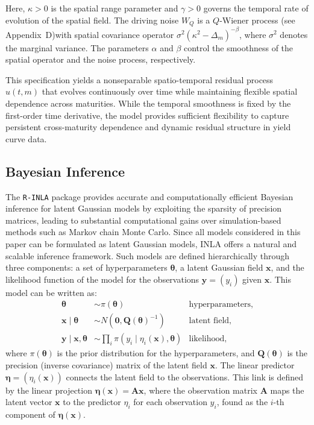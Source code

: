 \documentclass[
  12pt]{article}
\begin{document}
Here, $\kappa > 0$ is the spatial range parameter and $\gamma > 0$ governs the temporal rate of evolution of the spatial field. The driving noise $W_Q$ is a $Q$-Wiener process (see Appendix~D)with spatial covariance operator
$\sigma^2 (\kappa^2 - \Delta_m)^{-\beta}$, where $\sigma^2$ denotes the marginal variance. The parameters $\alpha$ and $\beta$ control the smoothness of the spatial operator and the noise process, respectively.

This specification yields a nonseparable spatio-temporal residual process $u(t,m)$ that evolves continuously over time while maintaining flexible spatial dependence across maturities. While the temporal smoothness is fixed by the first-order time derivative, the model provides sufficient flexibility to capture persistent cross-maturity dependence and dynamic residual structure in yield curve data.

\subsection{Bayesian Inference}\label{bayes}
The \texttt{R-INLA} package provides accurate and computationally efficient Bayesian inference for latent Gaussian models by exploiting the sparsity of precision matrices, leading to substantial computational gains over simulation-based methods such as Markov chain Monte Carlo. Since all models considered in this paper can be formulated as latent Gaussian models, INLA offers a natural and scalable inference framework. Such models are defined hierarchically through three components: a set of hyperparameters $\boldsymbol{\theta}$, a latent Gaussian field $\boldsymbol{x}$, and the likelihood function of the model for the observations $\boldsymbol{y} =(y_i)$ given $\boldsymbol{x}$. This model can be written as: 
\begin{align*}
    \boldsymbol{\theta} &\sim \pi(\boldsymbol{\theta})    & \text{hyperparameters},   \\
   \boldsymbol{x} \mid \boldsymbol{\theta} &\sim N(\boldsymbol{0}, \boldsymbol{Q}(\boldsymbol{\theta})^{-1}) \ &\text{latent field}, \\
   \boldsymbol{y} \mid \boldsymbol{x}, \boldsymbol{\theta} &\sim \prod_{i} \pi(y_i \mid \eta_i(\boldsymbol{x}), \boldsymbol{\theta}) &\text{likelihood},
\end{align*}
where $\pi(\boldsymbol{\theta})$ is the prior distribution for the hyperparameters, and $\boldsymbol{Q}(\boldsymbol{\theta})$ is the precision (inverse covariance) matrix of the latent field $\boldsymbol{x}$. The linear predictor $\boldsymbol{\eta} =(\eta_i(\boldsymbol{x}))$ connects the latent field to the observations. This link is defined by the linear projection $\boldsymbol{\eta}(\boldsymbol{x}) = \boldsymbol{A}\boldsymbol{x}$, where the observation matrix $\boldsymbol{A}$ maps the latent vector $\boldsymbol{x}$ to the predictor $\eta_i$ for each observation $y_i$, found as the $i$-th component of $\boldsymbol{\eta}(\boldsymbol{x})$.
\end{document}
